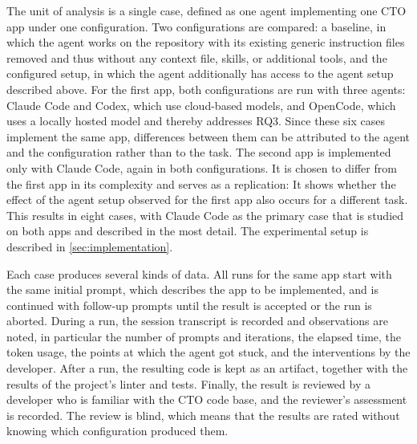 The unit of analysis is a single case, defined as one agent implementing one \ac{CTO} app under one configuration. Two configurations are compared: a baseline, in which the agent works on the repository with its existing generic instruction files removed and thus without any context file, skills, or additional tools, and the configured setup, in which the agent additionally has access to the agent setup described above. For the first app, both configurations are run with three agents: Claude Code and Codex, which use cloud-based models, and OpenCode, which uses a locally hosted model and thereby addresses RQ3.  Since these six cases implement the same app, differences between them can be attributed to the agent and the configuration rather than to the task. The second app is implemented only with Claude Code, again in both configurations. It is chosen to differ from the first app in its complexity and serves as a replication: It shows whether the effect of the agent setup observed for the first app also occurs for a different task.  This results in eight cases, with Claude Code as the primary case that is studied on both apps and described in the most detail. The experimental setup is described in \cref{sec:implementation}.

Each case produces several kinds of data. All runs for the same app start with the same initial prompt, which describes the app to be implemented, and is continued with follow-up prompts until the result is accepted or the run is aborted.  During a run, the session transcript is recorded and observations are noted, in particular the number of prompts and iterations, the elapsed time, the token usage, the points at which the agent got stuck, and the interventions by the developer. After a run, the resulting code is kept as an artifact, together with the results of the project's linter and tests. Finally, the result is reviewed by a developer who is familiar with the \ac{CTO} code base, and the reviewer's assessment is recorded. The review is blind, which means that the results are rated without knowing which configuration produced them. 

